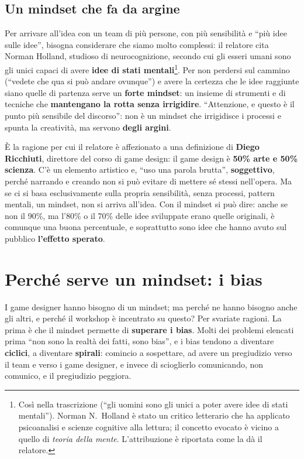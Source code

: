 \subsection{Un mindset che fa da argine}

Per arrivare all'idea con un team di più persone, con più sensibilità e ``più
idee sulle idee'', bisogna considerare che siamo molto complessi: il relatore
cita Norman Holland, studioso di neurocognizione, secondo cui gli esseri umani
sono gli unici capaci di avere \textbf{idee di stati mentali}\footnote{Così nella
trascrizione (``gli uomini sono gli unici a poter avere idee di stati
mentali''). Norman N.~Holland è stato un critico letterario che ha applicato
psicoanalisi e scienze cognitive alla lettura; il concetto evocato è vicino a
quello di \emph{teoria della mente}. L'attribuzione è riportata come la dà il
relatore.}. Per non perdersi sul cammino (``vedete che qua si può andare
ovunque'') e avere la certezza che le idee raggiunte siano quelle di partenza
serve un \textbf{forte mindset}: un insieme di strumenti e di tecniche che
\textbf{mantengano la rotta senza irrigidire}. ``Attenzione, e questo è il punto
più sensibile del discorso'': non è un mindset che irrigidisce i processi e
spunta la creatività, ma servono \textbf{degli argini}.

È la ragione per cui il relatore è affezionato a una definizione di
\textbf{Diego Ricchiuti}, direttore del corso di game design: il game design è
\textbf{50\% arte e 50\% scienza}. C'è un elemento artistico e, ``uso una parola
brutta'', \textbf{soggettivo}, perché narrando e creando non si può evitare di
mettere sé stessi nell'opera. Ma se ci si basa esclusivamente sulla propria
sensibilità, senza processi, pattern mentali, un mindset, non si arriva
all'idea. Con il mindset si può dire: anche se non il 90\%, ma l'80\% o il 70\%
delle idee sviluppate erano quelle originali, è comunque una buona percentuale,
e soprattutto sono idee che hanno avuto sul pubblico \textbf{l'effetto
sperato}.

\section{Perché serve un mindset: i bias}
\label{sec:z6-bias}

I game designer hanno bisogno di un mindset; ma perché ne hanno bisogno anche
gli altri, e perché il workshop è incentrato su questo? Per svariate ragioni.
La prima è che il mindset permette di \textbf{superare i bias}. Molti dei
problemi elencati prima ``non sono la realtà dei fatti, sono bias'', e i bias
tendono a diventare \textbf{ciclici}, a diventare \textbf{spirali}: comincio a
sospettare, ad avere un pregiudizio verso il team e verso i game designer, e
invece di scioglierlo comunicando, non comunico, e il pregiudizio peggiora.

